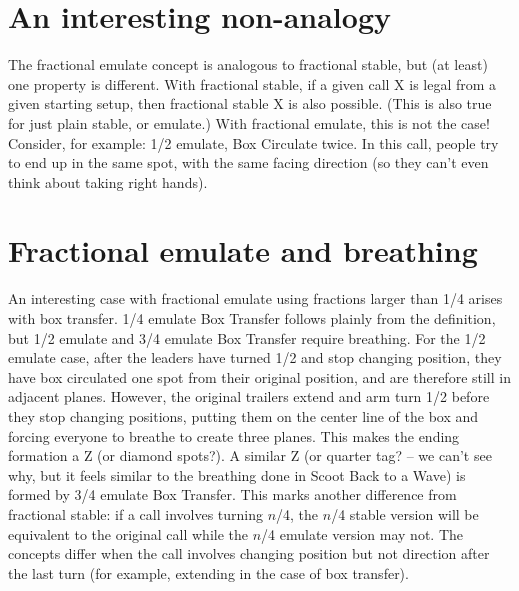 \documentclass[11pt]{article}
\begin{document}
\section{An interesting non-analogy}
\label{sec:nonanalogy}

The fractional emulate concept is analogous to fractional stable,
but (at least) one property is different.
With fractional stable,
if a given call X is legal from a given starting setup,
then fractional stable X is also possible.
(This is also true for just plain stable, or emulate.)
With fractional emulate, this is not the case!
Consider, for example: 1/2 emulate, Box Circulate twice.
In this call, people try to end up in the same spot,
with the same facing direction
(so they can't even think about taking right hands).


\section{Fractional emulate and breathing}

An interesting case with fractional emulate using fractions larger
than 1/4 arises with box transfer. 1/4 emulate Box Transfer
follows plainly from the definition,
but 1/2 emulate and 3/4 emulate
Box Transfer require breathing. For the 1/2 emulate case, after the leaders
have turned 1/2 and stop changing position, they have box circulated
one spot from their original position, and are therefore still in
adjacent planes. However, the original trailers extend and arm turn 1/2
before they stop changing positions, putting them on the center line
of the box and forcing everyone to breathe to create three planes.
This makes the ending formation a Z (or diamond spots?).
A similar Z (or quarter tag? -- we can't see why, but it feels similar
to the breathing done in Scoot Back to a Wave) is formed by
3/4 emulate Box Transfer. This marks another difference from
fractional stable: if a call involves turning $n$/4, the $n$/4 stable
version will be equivalent to the original call while the $n$/4
emulate version may not. The concepts differ when the call involves
changing position but not direction after the last turn (for example,
extending in the case of box transfer).

\end{document}
